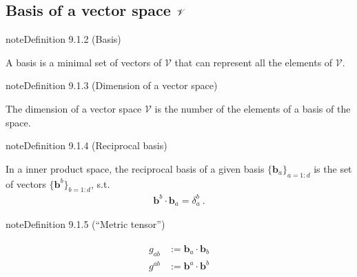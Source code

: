 \documentclass[letterpaper,10pt,english]{jupyterBook}
\begin{document}
\subsection{Basis of a vector space \protect\(\mathscr{V}\protect\)}
\label{\detokenize{ch/tensor-algebra-calculus/algebra:basis-of-a-vector-space-mathscr-v}}\label{ch/tensor-algebra-calculus/algebra:definition-1}
\begin{sphinxadmonition}{note}{Definition 9.1.2 (Basis)}



\sphinxAtStartPar
A basis is a minimal set of vectors of \(\mathscr{V}\) that can represent all the elements of \(\mathscr{V}\).
\end{sphinxadmonition}
\label{ch/tensor-algebra-calculus/algebra:definition-2}
\begin{sphinxadmonition}{note}{Definition 9.1.3 (Dimension of a vector space)}



\sphinxAtStartPar
The dimension of a vector space \(\mathscr{V}\) is the number of the elements of a basis of the space.
\end{sphinxadmonition}
\label{ch/tensor-algebra-calculus/algebra:definition-3}
\begin{sphinxadmonition}{note}{Definition 9.1.4 (Reciprocal basis)}



\sphinxAtStartPar
In a inner product space, the reciprocal basis of a given basis \(\{ \mathbf{b}_a \}_{a=1:d}\) is the set of vectors \(\{ \mathbf{b}^{b} \}_{b=1:d}\), s.t.
\begin{equation*}
\begin{split}\mathbf{b}^b \cdot \mathbf{b}_a = \delta_a^b \ .\end{split}
\end{equation*}\end{sphinxadmonition}
\label{ch/tensor-algebra-calculus/algebra:definition-4}
\begin{sphinxadmonition}{note}{Definition 9.1.5 (“Metric tensor”)}


\begin{equation*}
\begin{split}\begin{aligned}
  g_{ab} & := \mathbf{b}_a \cdot \mathbf{b}_b \\
  g^{ab} & := \mathbf{b}^a \cdot \mathbf{b}^b \\
\end{aligned}\end{split}
\end{equation*}\end{sphinxadmonition}
\end{document}
